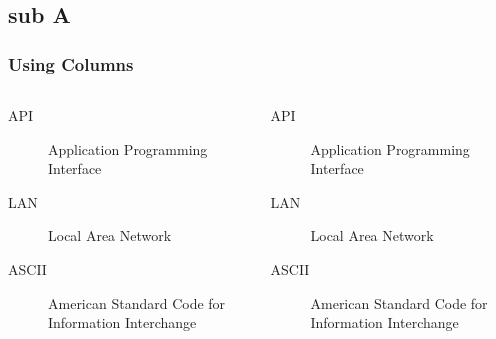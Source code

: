 \documentclass{beamer}
\begin{document}
\subsection{sub A}
\begin{frame}
\frametitle{Using Columns}
\begin{columns}
\begin{description}
\item[API] Application Programming Interface
\item[LAN] Local Area Network
\item[ASCII] American Standard Code for Information Interchange
\end{description}

\begin{description}
\item[API] Application Programming Interface
\item[LAN] Local Area Network
\item[ASCII] American Standard Code for Information Interchange
\end{description}

\end{columns}
\end{frame}
\end{document}
